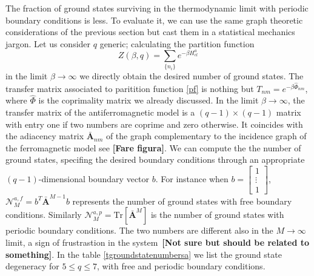 \documentclass[aps,pra,superscriptaddress]{revtex4}
\renewcommand{\(}{\left(}
\renewcommand{\)}{\right)}
\renewcommand{\[}{\left[}
\renewcommand{\]}{\right]}
\begin{document}
The fraction of ground states surviving in
the thermodynamic limit with periodic boundary conditions is less. To evaluate it, we can use the same graph theoretic considerations
of the previous section but cast them in a statistical mechanics jargon. Let us consider $q$ generic; calculating the partition function
\begin{equation}
\label{pf}
Z(\beta,q)=\sum_{\{n_i\}}e^{-\beta H_{cl}^{a}}
\end{equation}
in the limit $\beta\rightarrow\infty$ we directly obtain the desired number of ground states.
The transfer matrix associated to paritition function \eqref{pf} is nothing but $T_{nm}=e^{-\beta \hat{\Phi}_{nm}}$, where
$\hat{\Phi}$ is the coprimality matrix we already discussed. In the limit $\beta\rightarrow\infty$, the transfer matrix of
the antiferromagnetic model is a $(q-1)\times(q-1)$ matrix with entry one if two numbers are coprime and zero otherwise.
It coincides with the adiacency matrix $\mathbf{\bar{A}}_{nm}$ of the graph complementary
to the incidence graph of the ferromagnetic model
see \textbf{[Fare figura]}. We can compute the the number of ground states, specifing the desired boundary conditions through an appropriate
$(q-1)$-dimensional boundary vector $b$. For instance when $b=\begin{bmatrix}1\\
                                     \vdots\\
                                     1
\end{bmatrix}$, $\mathcal{N}^{a,f}_M=b^T\mathbf{\bar{A}}^{M-1}b$ represents the number of ground states with free boundary conditions. Similarly
 $\mathcal{N}^{a,p}_M=\text{Tr}[\mathbf{\bar{A}}^M]$ is the number of ground states with periodic boundary conditions. The two numbers are different also in the
 $M\rightarrow\infty$ limit,
 a sign of frustrastion in the system~\textbf{[Not sure but should be related to something]}.
 In the table \ref{tgroundstatenumbersa} we list the ground state degeneracy for
 $5\leq q\leq 7$, with free and periodic boundary conditions.
\end{document}
